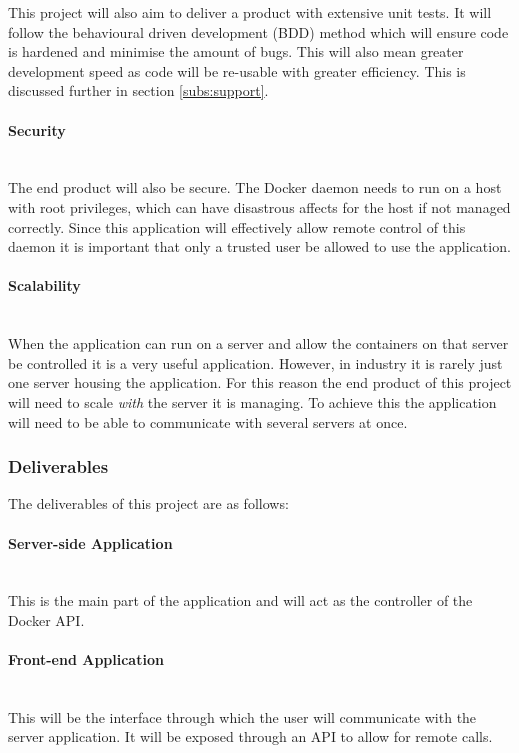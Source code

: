 This project will also aim to deliver a product with extensive unit tests. It will follow the behavioural driven development (BDD) method which will ensure code is hardened and minimise the amount of bugs. This will also mean greater development speed as code will be re-usable with greater efficiency. This is discussed further in section \ref{subs:support}.

\paragraph{Security}\mbox{}\\
The end product will also be secure. The Docker daemon needs to run on a host with root privileges, which can have disastrous affects for the host if not managed correctly. Since this application will effectively allow remote control of this daemon it is important that only a trusted user be allowed to use the application. 

\paragraph{Scalability}\mbox{}\\
When the application can run on a server and allow the containers on that server be controlled it is a very useful application. However, in industry it is rarely just one server housing the application. For this reason the end product of this project will need to scale \textit{with} the server it is managing. To achieve this the application will need to be able to communicate with several servers at once.

\subsubsection{Deliverables}
The deliverables of this project are as follows:

\paragraph{Server-side Application}\mbox{}\\
This is the main part of the application and will act as the controller of the Docker \gls{API}.

\paragraph{Front-end Application}\mbox{}\\
This will be the interface through which the user will communicate with the server application. It will be exposed through an API to allow for remote calls.

